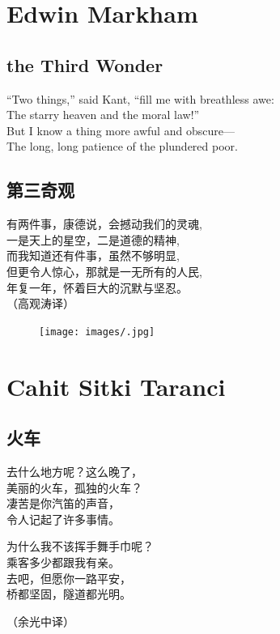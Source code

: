\documentclass[]{book}
\renewenvironment{quote}{\begin{VF}}{\end{VF}}
\begin{document}
\chapter{Edwin Markham}\label{edwin-markham}

\section{the Third Wonder}\label{the-third-wonder}

\begin{quote}
``Two things,'' said Kant, ``fill me with breathless awe:\\
The starry heaven and the moral law!''\\
But I know a thing more awful and obscure---\\
The long, long patience of the plundered poor.
\end{quote}

\section{第三奇观}

\begin{quote}
有两件事，康德说，会撼动我们的灵魂,\\
一是天上的星空，二是道德的精神,\\
而我知道还有件事，虽然不够明显,\\
但更令人惊心，那就是一无所有的人民,\\
年复一年，怀着巨大的沉默与坚忍。\\
（高观涛译）
\end{quote}

\begin{figure}[htbp]
\centering
\texttt{[image: images/.jpg]}
\caption{}
\end{figure}

\chapter{Cahit Sitki Taranci}\label{cahit-sitki-taranci}

\section{火车}

\begin{quote}
去什么地方呢？这么晚了，\\
美丽的火车，孤独的火车？\\
凄苦是你汽笛的声音，\\
令人记起了许多事情。

为什么我不该挥手舞手巾呢？\\
乘客多少都跟我有亲。\\
去吧，但愿你一路平安，\\
桥都坚固，隧道都光明。

（余光中译）
\end{quote}
\end{document}
